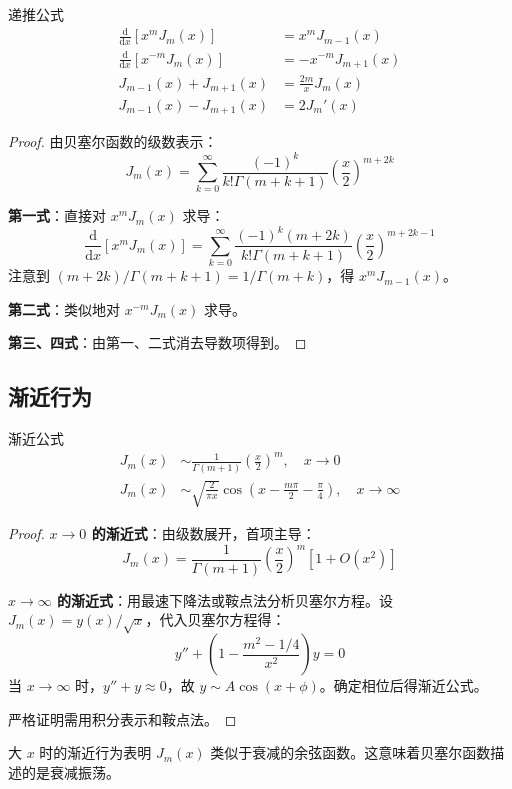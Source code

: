 \begin{dingli}{递推公式}{}
\begin{align}
    \frac{\mathrm{d}}{\mathrm{d}x}[x^m J_m(x)] &= x^m J_{m-1}(x) \\
    \frac{\mathrm{d}}{\mathrm{d}x}[x^{-m} J_m(x)] &= -x^{-m} J_{m+1}(x) \\
    J_{m-1}(x) + J_{m+1}(x) &= \frac{2m}{x}J_m(x) \\
    J_{m-1}(x) - J_{m+1}(x) &= 2J_m'(x)
\end{align}
\end{dingli}

\begin{proof}
由贝塞尔函数的级数表示：
\begin{equation}
    J_m(x) = \sum_{k=0}^{\infty} \frac{(-1)^k}{k!\Gamma(m+k+1)}\left(\frac{x}{2}\right)^{m+2k}
\end{equation}

\textbf{第一式}：直接对 $x^m J_m(x)$ 求导：
\begin{equation}
    \frac{\mathrm{d}}{\mathrm{d}x}[x^m J_m(x)] = \sum_{k=0}^{\infty} \frac{(-1)^k(m+2k)}{k!\Gamma(m+k+1)}\left(\frac{x}{2}\right)^{m+2k-1}
\end{equation}
注意到 $(m+2k)/\Gamma(m+k+1) = 1/\Gamma(m+k)$，得 $x^m J_{m-1}(x)$。

\textbf{第二式}：类似地对 $x^{-m} J_m(x)$ 求导。

\textbf{第三、四式}：由第一、二式消去导数项得到。
\end{proof}
\subsection{渐近行为}

\begin{dingli}{渐近公式}{}
\begin{align}
    J_m(x) &\sim \frac{1}{\Gamma(m+1)}\left(\frac{x}{2}\right)^m, \quad x \to 0 \\
    J_m(x) &\sim \sqrt{\frac{2}{\pi x}}\cos\left(x - \frac{m\pi}{2} - \frac{\pi}{4}\right), \quad x \to \infty
\end{align}
\end{dingli}

\begin{proof}
\textbf{$x \to 0$ 的渐近式}：由级数展开，首项主导：
\begin{equation}
    J_m(x) = \frac{1}{\Gamma(m+1)}\left(\frac{x}{2}\right)^m \left[1 + O(x^2)\right]
\end{equation}

\textbf{$x \to \infty$ 的渐近式}：用最速下降法或鞍点法分析贝塞尔方程。设 $J_m(x) = y(x)/\sqrt{x}$，代入贝塞尔方程得：
\begin{equation}
    y'' + \left(1 - \frac{m^2 - 1/4}{x^2}\right)y = 0
\end{equation}
当 $x \to \infty$ 时，$y'' + y \approx 0$，故 $y \sim A\cos(x + \phi)$。确定相位后得渐近公式。

严格证明需用积分表示和鞍点法。
\end{proof}
\begin{wulibj}[物理意义]
大 $x$ 时的渐近行为表明 $J_m(x)$ 类似于衰减的余弦函数。这意味着贝塞尔函数描述的是衰减振荡。
\end{wulibj}

